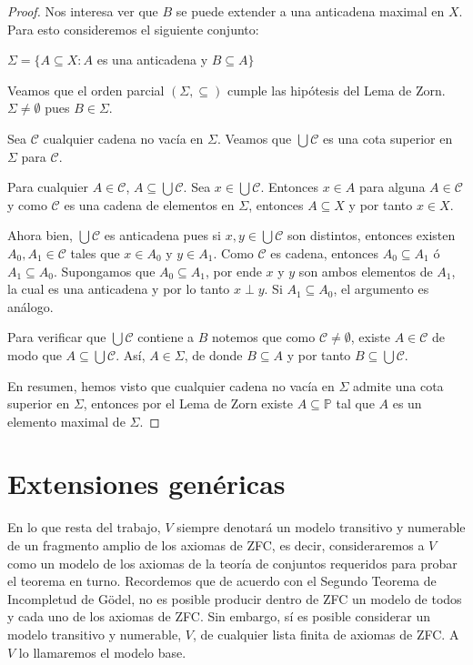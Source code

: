 \documentclass[11pt]{unam_tesis1}
\theoremstyle{MyThmStyle}
\theoremstyle{definition}
\theoremstyle{plain}
\theoremstyle{remark}
\newcommand{\vacio}{\emptyset}
\begin{document}
\begin{proof}
Nos interesa ver que $B$ se puede extender a una anticadena maximal en $X$. Para esto consideremos el siguiente conjunto:

\begin{center}
$\Sigma=\{A\subseteq X: A$ es una anticadena y $B\subseteq A\}$
\end{center}

Veamos que el orden parcial $(\Sigma, \subseteq)$ cumple las hip\'otesis del Lema de Zorn. $\Sigma \neq  \vacio$ pues $B\in \Sigma$. 

Sea $\mathcal C$ cualquier cadena no vac\'ia en $\Sigma$. Veamos que $\bigcup \mathcal C$ es una cota superior en $\Sigma$ para $\mathcal C$. 

Para cualquier $A\in \mathcal C$, $A\subseteq \bigcup \mathcal C$. Sea $x\in \bigcup \mathcal C$. Entonces $x\in A$ para alguna $A\in \mathcal C$ y como $\mathcal C$ es una cadena de elementos en $\Sigma$, entonces $A\subseteq X$ y por tanto $x\in X$.

Ahora bien, $\bigcup \mathcal C$ es anticadena pues si $x, y\in \bigcup \mathcal C$ son distintos, entonces existen $A_0, A_1\in \mathcal C$ tales que $x\in A_0$ y $y\in A_1$. Como $\mathcal C$ es cadena, entonces $A_0\subseteq A_1$ \'o $A_1\subseteq A_0$. Supongamos que $A_0\subseteq A_1$, por ende $x$ y $y$ son ambos elementos de $A_1$, la cual es una anticadena y por lo tanto $x\perp y$. Si $A_1\subseteq A_0$, el argumento es an\'alogo. 

Para verificar que $\bigcup \mathcal C$ contiene a $B$ notemos que como $\mathcal C\neq \emptyset$, existe $A\in \mathcal C$ de modo que $A\subseteq \bigcup \mathcal C$. As\'i, $A\in \Sigma$, de donde $B\subseteq A$ y por tanto $B\subseteq \bigcup \mathcal C$.

En resumen, hemos visto que cualquier cadena no vac\'ia en $\Sigma$ admite una cota superior en $\Sigma$, entonces por el Lema de Zorn existe $A\subseteq \mathbb P$ tal que $A$ es un elemento maximal de $\Sigma$.
\end{proof}


\section{Extensiones gen\'ericas}

En lo que resta del trabajo, $V$ siempre denotar\'a un modelo transitivo y numerable de un fragmento amplio de los axiomas de ZFC, es decir, consideraremos a $V$ como un modelo de los axiomas de la teor\'ia de conjuntos requeridos para probar el teorema en turno. Recordemos que de acuerdo con el Segundo Teorema de Incompletud de G\"{o}del, no es posible producir dentro de ZFC un modelo de todos y cada uno de los axiomas de ZFC. Sin embargo, s\'i es posible considerar un modelo transitivo y numerable, $V$, de cualquier lista finita de axiomas de ZFC. A $V$ lo llamaremos el modelo base.
\end{document}
